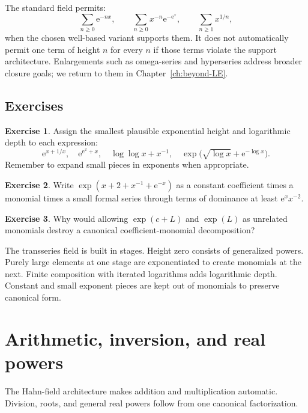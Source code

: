 \documentclass[11pt,openany]{book}
\theoremstyle{definition}
\newtheorem{exercise}{Exercise}[chapter]
\theoremstyle{plain}
\theoremstyle{remark}
\newcommand{\e}{\mathrm{e}}
\begin{document}
The standard field permits:
\[
 \sum_{n\ge0}\e^{-nx},
 \qquad
 \sum_{n\ge0}x^{-n}\e^{-\e^x},
 \qquad
 \sum_{n\ge1}x^{1/n},
\]
when the chosen well-based variant supports them. It does not automatically permit one term of height $n$ for every $n$ if those terms violate the support architecture. Enlargements such as omega-series and hyperseries address broader closure goals; we return to them in Chapter~\ref{ch:beyond-LE}.

\section{Exercises}

\begin{exercise}
Assign the smallest plausible exponential height and logarithmic depth to each expression:
\[
 \e^{x+1/x},\quad
 \e^{\e^x+x},\quad
 \log\log x+x^{-1},\quad
 \exp\!\bigl(\sqrt{\log x}+\e^{-\log x}\bigr).
\]
Remember to expand small pieces in exponents when appropriate.
\end{exercise}

\begin{exercise}
Write $\exp(x+2+x^{-1}+\e^{-x})$ as a constant coefficient times a monomial times a small formal series through terms of dominance at least $\e^xx^{-2}$.
\end{exercise}

\begin{exercise}
Why would allowing $\exp(c+L)$ and $\exp(L)$ as unrelated monomials destroy a canonical coefficient-monomial decomposition?
\end{exercise}

\begin{summarybox}
The transseries field is built in stages. Height zero consists of generalized powers. Purely large elements at one stage are exponentiated to create monomials at the next. Finite composition with iterated logarithms adds logarithmic depth. Constant and small exponent pieces are kept out of monomials to preserve canonical form.
\end{summarybox}


\chapter{Arithmetic, inversion, and real powers}\label{ch:arithmetic}

The Hahn-field architecture makes addition and multiplication automatic. Division, roots, and general real powers follow from one canonical factorization.
\end{document}
